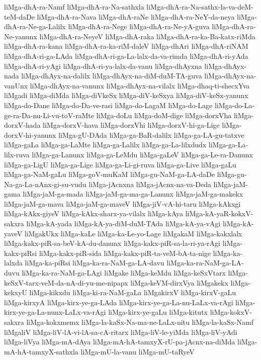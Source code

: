 {liMga-dhA-ra-Namf
liMga-dhA-ra-Na-sathxla
liMga-dhA-ra-Na-sathx-la-va-deM-teM-daDe
liMga-dhA-ra-Nava
liMga-dhA-raNe
liMga-dhA-ra-NeY-da-neya
liMga-dhA-ra-Ne-ga-Lalilx
liMga-dhA-ra-Nege
liMga-dhA-ra-Ne-yA-guva
liMga-dhA-ra-Ne-yanunx
liMga-dhA-ra-NeyeV
liMga-dhA-raka
liMga-dhA-ra-ka-Ba-katx-riMda
liMga-dhA-ra-kana
liMga-dhA-ra-ka-riM-daleV
liMga-dhAri
liMga-dhA-riNAM
liMga-dhA-ri-ga-LAda
liMga-dhA-ri-ga-La-lalx-da-va-rimda
liMga-dhA-ri-yAda
liMga-dhA-ri-yAgi
liMga-dhA-ri-ya-lalx-da-vanu
liMga-dhAyxna
liMga-dhAyx-nada
liMga-dhAyx-na-dalilx
liMga-dhAyx-na-diM-duM-TA-guva
liMga-dhAyx-na-vanUnx
liMga-dhAyx-na-vanunx
liMga-dhAyx-na-vilalx
liMga-dhaq-ti-shecxYva
liMgadi
liMga-diMda
liMga-diVkeSx
liMga-diV-keSxya
liMga-diV-keSx-yanunx
liMga-do-Dane
liMga-do-Da-ve-rasi
liMga-do-LagaM
liMga-do-Lage
liMga-do-La-ge-ra-Da-nu-Li-vu-toV-raMte
liMga-doLu
liMga-doM-dige
liMga-dorxVha
liMga-dorxV-hada
liMga-dorxV-hava
liMga-dorxVhi
liMga-dorxV-hi-ga-Lige
liMga-dorxV-hi-yanunx
liMga-gU-DAda
liMga-ga-BaR-dalilx
liMga-ga-LA-gu-tatxve
liMga-gaLa
liMga-ga-LaMte
liMga-ga-Lalilx
liMga-ga-La-lilxdudx
liMga-ga-La-lilx-ruva
liMga-ga-Lanunx
liMga-ga-LeMdu
liMga-gaLeV
liMga-ga-Le-ra-Danunx
liMga-ga-LigU
liMga-ga-Lige
liMga-ga-Li-gi-ruva
liMga-ga-Live
liMga-gaLu
liMga-ga-NaM-gaLu
liMga-goV-muKaM
liMga-gu-NaM-ga-LA-daDe
liMga-gu-Na-ga-La-nAnx-gi-su-vudu
liMga-jAcnxna
liMga-jAcnx-na-va-Deda
liMga-jaM-gama
liMga-jaM-ga-mada
liMga-jaM-ga-ma-ga-Lanunx
liMga-jaM-ga-makekx
liMga-jaM-ga-mava
liMga-jaM-ga-maveV
liMga-jiV-vA-hi-taru
liMga-kAkxgi
liMga-kAkx-giyeV
liMga-kAkx-sharx-ya-vilalx
liMga-kAya
liMga-kA-yaR-kokxV-sakxra
liMga-kA-yada
liMga-kA-ya-diM-duM-TAda
liMga-kA-ya-vAgi
liMga-kA-yaveV
liMgakUkx
liMga-kaLe
liMga-ka-Le-yo-Lage
liMgakaM
liMga-kakxlalx
liMga-kakx-piR-sa-beV-kA-du-danunx
liMga-kakx-piR-sa-la-ri-ya-rAgi
liMga-kakx-piRsi
liMga-kakx-piR-sida
liMga-kakx-piR-ta-veM-bA-ta-nige
liMga-ka-lalxda
liMga-ka-piRsi
liMga-ka-ra-NaM-ga-LA-davu
liMga-ka-ra-NaM-ga-LA-duvu
liMga-ka-ra-NaM-ga-LAgi
liMgake
liMga-keMdu
liMga-keSxVtarx
liMga-keSxV-tarx-veM-da-nA-di-yu-me-nipapx
liMga-keVM-dirxVya
liMgakekx
liMga-kekxyU
liMga-kikxdu
liMga-ki-ra-NaM-gaLa
liMgakirxV
liMga-kirxV-gaLu
liMga-kirxyA
liMga-kirx-ye-ga-LAda
liMga-kirx-ye-ga-La-nu-LaLx-va-rAgi
liMga-kirx-ye-ga-La-nunx-LaLx-va-rAgi
liMga-kirx-ye-gaLu
liMga-kitutx
liMga-kokxV-sakxra
liMga-kokxmemx
liMga-la-kaSx-Na-ma-ne-LaLx-nitu
liMga-la-kaSx-Namf
liMgaliV
liMga-liV-lA-vi-lA-sa-cA-ritarx
liMga-liV-le-yiMda
liMga-liV-yAdi
liMga-liVya
liMga-mA-dAya
liMga-mA-hA-tamxyX-rU-pa-jAcnx-na-diMda
liMga-mA-hA-tamxyX-sathxla
liMga-mU-la-vanu
liMga-mU-taRyeV
}
